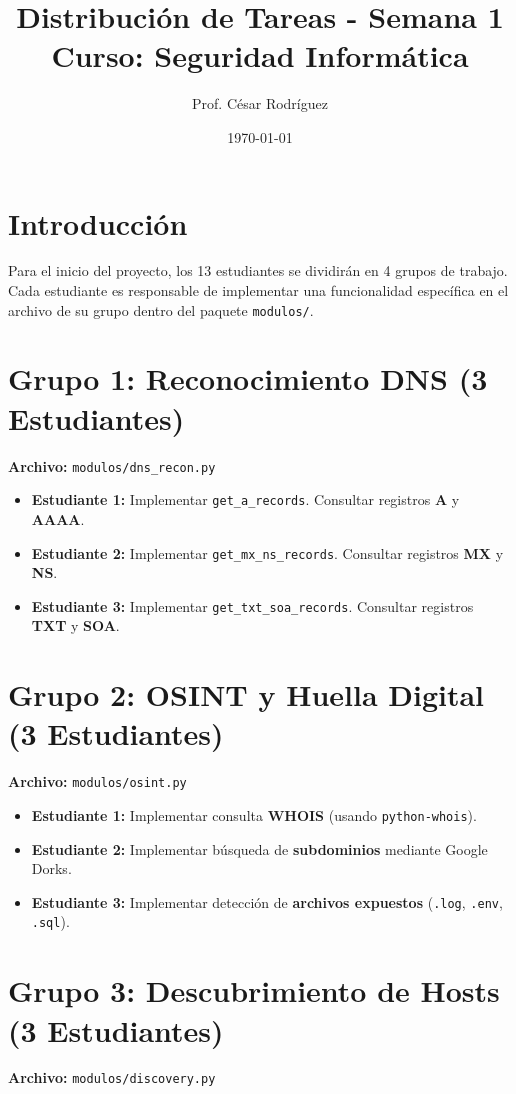 \documentclass[12pt,a4paper]{article}
\title{Distribución de Tareas - Semana 1 \\ \large Curso: Seguridad Informática}
\author{Prof. César Rodríguez}
\date{\today}
\begin{document}
\maketitle

\section{Introducción}
Para el inicio del proyecto, los 13 estudiantes se dividirán en 4 grupos de trabajo. Cada estudiante es responsable de implementar una funcionalidad específica en el archivo de su grupo dentro del paquete \texttt{modulos/}.

\section{Grupo 1: Reconocimiento DNS (3 Estudiantes)}
\textbf{Archivo:} \texttt{modulos/dns\_recon.py}

\begin{itemize}[label=$\bullet$]
    \item \textbf{Estudiante 1:} Implementar \texttt{get\_a\_records}. Consultar registros \textbf{A} y \textbf{AAAA}.
    \item \textbf{Estudiante 2:} Implementar \texttt{get\_mx\_ns\_records}. Consultar registros \textbf{MX} y \textbf{NS}.
    \item \textbf{Estudiante 3:} Implementar \texttt{get\_txt\_soa\_records}. Consultar registros \textbf{TXT} y \textbf{SOA}.
\end{itemize}

\section{Grupo 2: OSINT y Huella Digital (3 Estudiantes)}
\textbf{Archivo:} \texttt{modulos/osint.py}

\begin{itemize}[label=$\bullet$]
    \item \textbf{Estudiante 1:} Implementar consulta \textbf{WHOIS} (usando \texttt{python-whois}).
    \item \textbf{Estudiante 2:} Implementar búsqueda de \textbf{subdominios} mediante Google Dorks.
    \item \textbf{Estudiante 3:} Implementar detección de \textbf{archivos expuestos} (\texttt{.log}, \texttt{.env}, \texttt{.sql}).
\end{itemize}

\section{Grupo 3: Descubrimiento de Hosts (3 Estudiantes)}
\textbf{Archivo:} \texttt{modulos/discovery.py}
\end{document}
